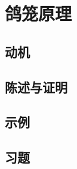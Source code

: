 \section{鸽笼原理}\label{sec:section8.6}

\subsection{动机}

\subsection{陈述与证明}

\subsection{示例}

\subsection{习题}